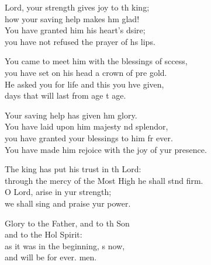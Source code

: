\settowidth{\versewidth}{You have made him rejoice with the joy of your presence.}
\begin{psalmverse}%
  \begin{patverse}
 Lord, your strength gives joy to th king;\Med\\
how your saving help makes h\pointup{\i}m glad!\\
You have granted him his heart’s dsire;\Med\\
you have not refused the prayer of h\pointup{\i}s lips.

You came to meet him with the blessings of sccess,\Med\\
you have set on his head a crown of pre gold.\\
He asked you for life and this you hve given,\Med\\
days that will last from age t age.

Your saving help has given h\pointup{\i}m glory.\Med\\
You have laid upon him majesty nd splendor,\\
you have granted your blessings to him fr ever.\Med\\
You have made him rejoice with the joy of yur presence.

The king has put his trust in th Lord:\Med\\
through the mercy of the Most High he shall stnd firm.\\
O Lord, arise in yur strength;\Med\\
we shall sing and praise yur power.

Glory to the Father, and to th Son\Med\\
and to the Hol Spirit:\\
as it was in the beginning, \pointup{\i}s now,\Med\\
and will be for ever. men.
  \end{patverse}
\end{psalmverse}
